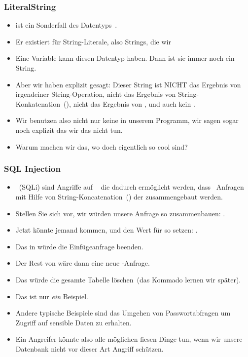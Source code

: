 \documentclass[aspectratio=169,mathserif,notheorems]{beamer}%
\begin{document}
%
\begin{frame}%
\frametitle{LiteralString}%
\begin{itemize}%
\item {} ist ein Sonderfall des Datentyps~.%
\item<2-> Er existiert für String-Literale, also Strings, die wir %
\item<3-> Eine Variable kann diesen Datentyp haben. Dann ist sie immer noch ein String.%
\item<4-> Aber wir haben explizit gesagt: Dieser String ist \alert{NICHT} das Ergebnis von irgendeiner String-Operation, nicht das Ergebnis von String-Konkatenation~(\pythonil{+}), nicht das Ergebnis von , und auch kein .%
\item<5-> Wir benutzen also nicht nur keine  in unserem Programm, wir sagen sogar noch explizit das wir das nicht tun.%
\item<6-> Warum machen wir das, wo  doch eigentlich so cool sind\cite{programmingWithPython}?%
\end{itemize}%
\end{frame}%
%
\begin{frame}%
\frametitle{SQL Injection}%
\begin{itemize}%
\item {}~(SQLi)\cite{ASO2024SIADPP,KDP2024AOSIAITCAIWA,CMCVGHRDCAAFL2023SIADINFD,S2008SI,databases} sind Angriffe auf \sql\  die dadurch ermöglicht werden, dass \sql\ Anfragen mit Hilfe von String-Koncatenation~(\python{+}) der  zusammengebaut werden.%
\item<2-> Stellen Sie sich vor, wir würden unsere Anfrage so zusammenbauen: .%
\item<3-> Jetzt könnte jemand kommen, und den Wert für  so setzen: .%
\item<4-> Das \textil{);} in  würde die Einfügeanfrage beenden.%
\item<5-> Der Rest von  wäre dann eine neue \sql-Anfrage.%
\item<6-> Das  würde die gesamte Tabelle  löschen~(das Kommado lernen wir später).%
\item<7-> Das ist nur \emph{ein} Beispiel.%
\item<8-> Andere typische Beispiele sind das Umgehen von Passwortabfragen um Zugriff auf sensible Daten zu erhalten.%
\item<9-> Ein Angreifer könnte also alle möglichen fiesen Dinge tun, wenn wir unsere Datenbank nicht vor dieser Art Angriff schützen.%
\end{itemize}%
\end{frame}%
\end{document}
